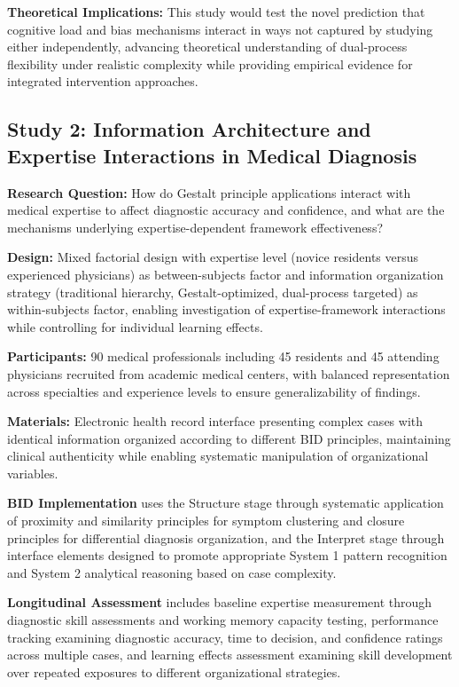 \documentclass[
  authoryear,
  preprint]{elsarticle}
\begin{document}
\textbf{Theoretical Implications:} This study would test the novel
prediction that cognitive load and bias mechanisms interact in ways not
captured by studying either independently, advancing theoretical
understanding of dual-process flexibility under realistic complexity
while providing empirical evidence for integrated intervention
approaches.

\subsection{Study 2: Information Architecture and Expertise Interactions
in Medical
Diagnosis}\label{study-2-information-architecture-and-expertise-interactions-in-medical-diagnosis}

\textbf{Research Question:} How do Gestalt principle applications
interact with medical expertise to affect diagnostic accuracy and
confidence, and what are the mechanisms underlying expertise-dependent
framework effectiveness?

\textbf{Design:} Mixed factorial design with expertise level (novice
residents versus experienced physicians) as between-subjects factor and
information organization strategy (traditional hierarchy,
Gestalt-optimized, dual-process targeted) as within-subjects factor,
enabling investigation of expertise-framework interactions while
controlling for individual learning effects.

\textbf{Participants:} 90 medical professionals including 45 residents
and 45 attending physicians recruited from academic medical centers,
with balanced representation across specialties and experience levels to
ensure generalizability of findings.

\textbf{Materials:} Electronic health record interface presenting
complex cases with identical information organized according to
different BID principles, maintaining clinical authenticity while
enabling systematic manipulation of organizational variables.

\textbf{BID Implementation} uses the Structure stage through systematic
application of proximity and similarity principles for symptom
clustering and closure principles for differential diagnosis
organization, and the Interpret stage through interface elements
designed to promote appropriate System 1 pattern recognition and System
2 analytical reasoning based on case complexity.

\textbf{Longitudinal Assessment} includes baseline expertise measurement
through diagnostic skill assessments and working memory capacity
testing, performance tracking examining diagnostic accuracy, time to
decision, and confidence ratings across multiple cases, and learning
effects assessment examining skill development over repeated exposures
to different organizational strategies.
\end{document}
